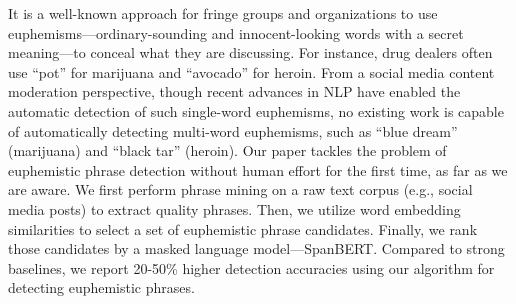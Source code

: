 It is a well-known approach for fringe groups and organizations to use euphemisms---ordinary-sounding and innocent-looking words with a secret meaning---to conceal what they are discussing. For instance, drug dealers often use ``pot'' for marijuana and ``avocado'' for heroin. From a social media content moderation perspective, though recent advances in NLP have enabled the automatic detection of such single-word euphemisms, no existing work is capable of automatically detecting multi-word euphemisms, such as ``blue dream'' (marijuana) and ``black tar'' (heroin). Our paper tackles the problem of euphemistic phrase detection without human effort for the first time, as far as we are aware. We first perform phrase mining on a raw text corpus (e.g., social media posts) to extract quality phrases. Then, we utilize word embedding similarities to select a set of euphemistic phrase candidates. Finally, we rank those candidates by a masked language model---SpanBERT. Compared to strong baselines, we report 20-50\% higher detection accuracies using our algorithm for detecting euphemistic phrases.
